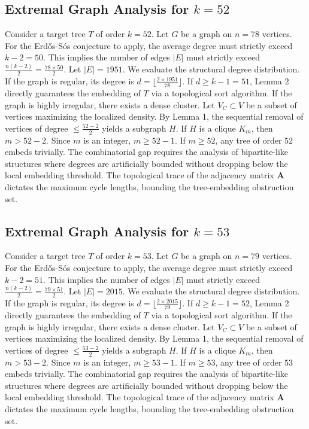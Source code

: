 \documentclass[11pt,a4paper]{article}
\begin{document}
\subsection{Extremal Graph Analysis for $k=52$}
Consider a target tree $T$ of order $k=52$.
Let $G$ be a graph on $n=78$ vertices.
For the Erd\H{o}s-S\'os conjecture to apply, the average degree must strictly exceed $k-2 = 50$.
This implies the number of edges $|E|$ must strictly exceed $\frac{n(k-2)}{2} = \frac{78 \times 50}{2}$.
Let $|E| = 1951$.
We evaluate the structural degree distribution. If the graph is regular, its degree is $d = \lfloor \frac{2 \times 1951}{78} \rfloor$.
If $d \geq k-1 = 51$, Lemma 2 directly guarantees the embedding of $T$ via a topological sort algorithm.
If the graph is highly irregular, there exists a dense cluster. Let $V_C \subset V$ be a subset of vertices maximizing the localized density.
By Lemma 1, the sequential removal of vertices of degree $\leq \frac{52-2}{2}$ yields a subgraph $H$.
If $H$ is a clique $K_{m}$, then $m > 52-2$. Since $m$ is an integer, $m \geq 52-1$. If $m \geq 52$, any tree of order $52$ embeds trivially.
The combinatorial gap requires the analysis of bipartite-like structures where degrees are artificially bounded without dropping below the local embedding threshold. The topological trace of the adjacency matrix $\mathbf{A}$ dictates the maximum cycle lengths, bounding the tree-embedding obstruction set.


\subsection{Extremal Graph Analysis for $k=53$}
Consider a target tree $T$ of order $k=53$.
Let $G$ be a graph on $n=79$ vertices.
For the Erd\H{o}s-S\'os conjecture to apply, the average degree must strictly exceed $k-2 = 51$.
This implies the number of edges $|E|$ must strictly exceed $\frac{n(k-2)}{2} = \frac{79 \times 51}{2}$.
Let $|E| = 2015$.
We evaluate the structural degree distribution. If the graph is regular, its degree is $d = \lfloor \frac{2 \times 2015}{79} \rfloor$.
If $d \geq k-1 = 52$, Lemma 2 directly guarantees the embedding of $T$ via a topological sort algorithm.
If the graph is highly irregular, there exists a dense cluster. Let $V_C \subset V$ be a subset of vertices maximizing the localized density.
By Lemma 1, the sequential removal of vertices of degree $\leq \frac{53-2}{2}$ yields a subgraph $H$.
If $H$ is a clique $K_{m}$, then $m > 53-2$. Since $m$ is an integer, $m \geq 53-1$. If $m \geq 53$, any tree of order $53$ embeds trivially.
The combinatorial gap requires the analysis of bipartite-like structures where degrees are artificially bounded without dropping below the local embedding threshold. The topological trace of the adjacency matrix $\mathbf{A}$ dictates the maximum cycle lengths, bounding the tree-embedding obstruction set.
\end{document}
